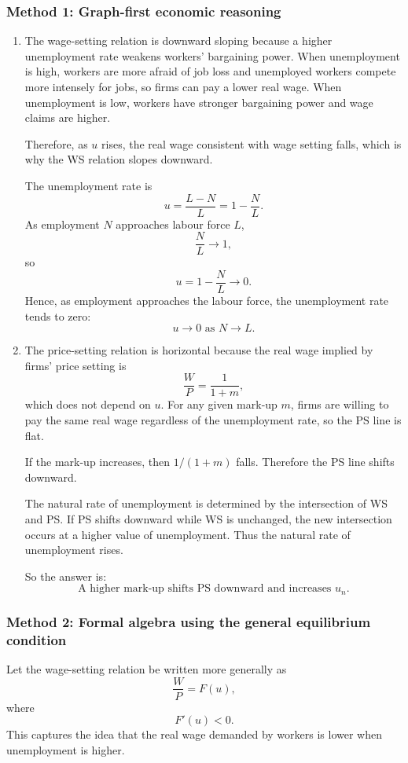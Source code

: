 \documentclass[12pt]{article}
\begin{document}
\subsubsection{Method 1: Graph-first economic reasoning}
\begin{enumerate}[label=(\alph*)]
    \item
    The wage-setting relation is downward sloping because a higher unemployment rate weakens workers' bargaining power. When unemployment is high, workers are more afraid of job loss and unemployed workers compete more intensely for jobs, so firms can pay a lower real wage. When unemployment is low, workers have stronger bargaining power and wage claims are higher.

    Therefore, as \(u\) rises, the real wage consistent with wage setting falls, which is why the WS relation slopes downward.

    The unemployment rate is
    \[
    u=\frac{L-N}{L}=1-\frac{N}{L}.
    \]
    As employment \(N\) approaches labour force \(L\),
    \[
    \frac{N}{L}\to 1,
    \]
    so
    \[
    u=1-\frac{N}{L}\to 0.
    \]
    Hence, as employment approaches the labour force, the unemployment rate tends to zero:
    \[
    \boxed{u\to 0 \text{ as } N\to L.}
    \]

    \item
    The price-setting relation is horizontal because the real wage implied by firms' price setting is
    \[
    \frac{W}{P}=\frac{1}{1+m},
    \]
    which does not depend on \(u\). For any given mark-up \(m\), firms are willing to pay the same real wage regardless of the unemployment rate, so the PS line is flat.

    If the mark-up increases, then \(1/(1+m)\) falls. Therefore the PS line shifts downward.

    The natural rate of unemployment is determined by the intersection of WS and PS. If PS shifts downward while WS is unchanged, the new intersection occurs at a higher value of unemployment. Thus the natural rate of unemployment rises.

    So the answer is:
    \[
    \boxed{\text{A higher mark-up shifts PS downward and increases }u_n.}
    \]
\end{enumerate}

\subsubsection{Method 2: Formal algebra using the general equilibrium condition}
Let the wage-setting relation be written more generally as
\[
\frac{W}{P}=F(u),
\]
where
\[
F'(u)<0.
\]
This captures the idea that the real wage demanded by workers is lower when unemployment is higher.
\end{document}
